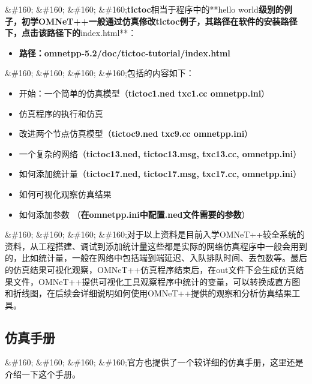 \&\#160; \&\#160; \&\#160; \&\#160;\textbf{tictoc}相当于程序中的**hello world\textbf{级别的例子，初学OMNeT++一般通过仿真修改\textbf{tictoc}例子，其路径在软件的安装路径下，点击该路径下的}index.html**：

\begin{itemize}
\item \textbf{路径：omnetpp-5.2\slash doc\slash tictoc-tutorial\slash index.html} 

\end{itemize}

\&\#160; \&\#160; \&\#160; \&\#160;包括的内容如下：

\begin{itemize}
\item 开始：一个简单的仿真模型（\textbf{tictoc1.ned txc1.cc omnetpp.ini}）

\item 仿真程序的执行和仿真

\item 改进两个节点仿真模型（\textbf{tictoc9.ned txc9.cc omnetpp.ini}）

\item 一个复杂的网络（\textbf{tictoc13.ned, tictoc13.msg, txc13.cc, omnetpp.ini}）

\item 如何添加统计量（\textbf{tictoc17.ned, tictoc17.msg, txc17.cc, omnetpp.ini}）

\item 如何可视化观察仿真结果

\item 如何添加参数 （\textbf{在omnetpp.ini中配置.ned文件需要的参数}）

\end{itemize}

\&\#160; \&\#160; \&\#160; \&\#160;对于以上资料是目前入学OMNeT++较全系统的资料，从工程搭建、调试到添加统计量这些都是实际的网络仿真程序中一般会用到的，比如统计量，一般在网络中包括端到端延迟、入队排队时间、丢包数等。最后的仿真结果可视化观察，OMNeT++仿真程序结束后，在out文件下会生成仿真结果文件，OMNeT++提供可视化工具观察程序中统计的变量，可以转换成直方图和折线图，在后续会详细说明如何使用OMNeT++提供的观察和分析仿真结果工具。

\subsection{仿真手册}
\label{仿真手册}

\&\#160; \&\#160; \&\#160; \&\#160;官方也提供了一个较详细的仿真手册，这里还是介绍一下这个手册。

